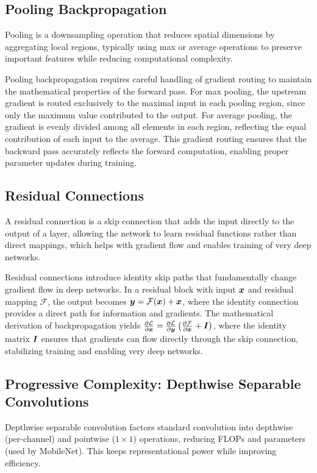 \subsection{Pooling Backpropagation}
Pooling is a downsampling operation that reduces spatial dimensions by aggregating local regions, typically using max or average operations to preserve important features while reducing computational complexity.

Pooling backpropagation requires careful handling of gradient routing to maintain the mathematical properties of the forward pass. For max pooling, the upstream gradient is routed exclusively to the maximal input in each pooling region, since only the maximum value contributed to the output. For average pooling, the gradient is evenly divided among all elements in each region, reflecting the equal contribution of each input to the average. This gradient routing ensures that the backward pass accurately reflects the forward computation, enabling proper parameter updates during training.

\subsection{Residual Connections}
A residual connection is a skip connection that adds the input directly to the output of a layer, allowing the network to learn residual functions rather than direct mappings, which helps with gradient flow and enables training of very deep networks.

Residual connections introduce identity skip paths that fundamentally change gradient flow in deep networks. In a residual block with input $\boldsymbol{x}$ and residual mapping $\mathcal{F}$, the output becomes $\boldsymbol{y}=\mathcal{F}(\boldsymbol{x})+\boldsymbol{x}$, where the identity connection provides a direct path for information and gradients. The mathematical derivation of backpropagation yields $\frac{\partial \mathcal{L}}{\partial \boldsymbol{x}}=\frac{\partial \mathcal{L}}{\partial \boldsymbol{y}}\left(\frac{\partial \mathcal{F}}{\partial \boldsymbol{x}}+\boldsymbol{I}\right)$, where the identity matrix $\boldsymbol{I}$ ensures that gradients can flow directly through the skip connection, stabilizing training and enabling very deep networks.\cite{He2016}

\subsection{Progressive Complexity: Depthwise Separable Convolutions}
Depthwise separable convolution factors standard convolution into depthwise (per-channel) and pointwise ($1\times1$) operations, reducing FLOPs and parameters (used by MobileNet). This keeps representational power while improving efficiency.

